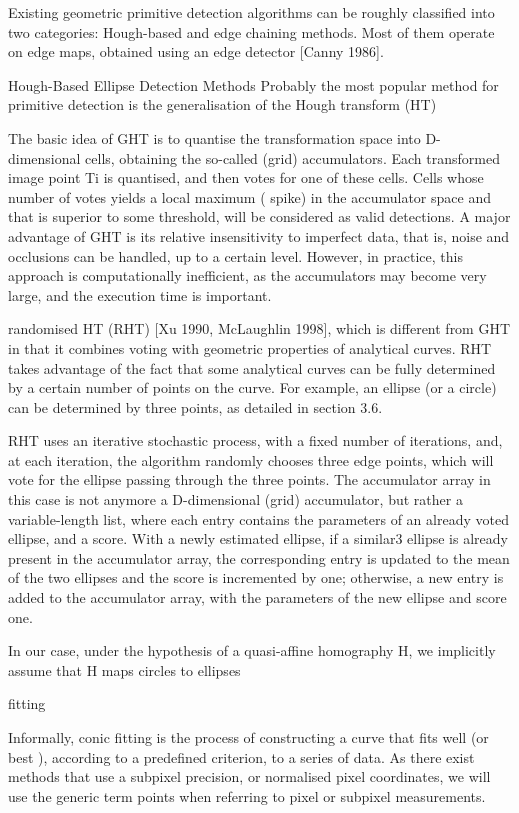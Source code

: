 \documentclass[a4paper]{report}
\begin{document}
Existing geometric primitive detection algorithms can be roughly classified into two categories:
Hough-based and edge chaining methods. Most of them operate on edge maps, obtained
using an edge detector [Canny 1986].

Hough-Based Ellipse Detection Methods
Probably the most popular method for primitive detection is the generalisation of the Hough transform (HT)

The
basic idea of GHT is to quantise the transformation space into D-dimensional cells, obtaining
the so-called (grid) accumulators. Each transformed image point Ti is quantised, and then
votes for one of these cells. Cells whose number of votes yields a local maximum ( spike) in the
accumulator space and that is superior to some threshold, will be considered as valid detections.
A major advantage of GHT is its relative insensitivity to imperfect data, that is, noise
and occlusions can be handled, up to a certain level. However, in practice, this approach is
computationally inefficient, as the accumulators may become very large, and the execution
time is important.

randomised HT (RHT) [Xu 1990, McLaughlin 1998],
which is different from GHT in that it combines voting with geometric properties of analytical
curves. RHT takes advantage of the fact that some analytical curves can be fully determined by
a certain number of points on the curve. For example, an ellipse (or a circle) can be determined
by three points, as detailed in section 3.6.

RHT uses an iterative stochastic process, with a
fixed number of iterations, and, at each iteration, the algorithm randomly chooses three edge
points, which will vote for the ellipse passing through the three points. The accumulator array
in this case is not anymore a D-dimensional (grid) accumulator, but rather a variable-length
list, where each entry contains the parameters of an already voted ellipse, and a score. With
a newly estimated ellipse, if a similar3 ellipse is already present in the accumulator array, the
corresponding entry is updated to the mean of the two ellipses and the score is incremented by
one; otherwise, a new entry is added to the accumulator array, with the parameters of the new
ellipse and score one.

In our case, under the hypothesis of a
quasi-affine homography H, we implicitly assume that H maps circles to ellipses


fitting

Informally, conic fitting is the process of constructing a curve that fits well (or best ), according
to a predefined criterion, to a series of data.
As there exist methods that
use a subpixel precision, or normalised pixel coordinates, we will use the generic term points
when referring to pixel or subpixel measurements.
\end{document}
